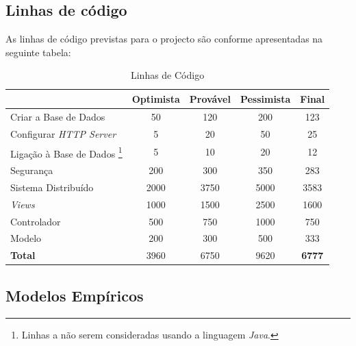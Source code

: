 \documentclass[12pt, a4paper, twoside]{report} %
\begin{document}
\subsection{Linhas de código}

As linhas de código previstas para o projecto são conforme apresentadas na seguinte tabela:

\begin{savenotes}
\begin{table}[h]
\centering
\begin{tabular}{|l|c c c c|}
\hline
										& Optimista & Provável & Pessimista & \textbf{Final} \\ \hline
Criar a Base de Dados  					& 50        & 120      & 200        & 123   		 \\ \hline
Configurar \textit{HTTP Server} 		& 5         & 20       & 50         & 25    		 \\ \hline
Ligação à Base de Dados \footnote{Linhas a não serem consideradas usando a linguagem \textit{Java}.}
										& 5         & 10       & 20         & 12    		 \\ \hline
Segurança              					& 200       & 300      & 350        & 283   		 \\ \hline
Sistema Distribuído\footnotemark	    & 2000      & 3750     & 5000       & 3583   		 \\ \hline
\textit{Views}            				& 1000      & 1500     & 2500       & 1600  		 \\ \hline
Controlador                 			& 500       & 750      & 1000       & 750   		 \\ \hline
Modelo                      			& 200       & 300      & 500        & 333   		 \\ \hline
\textbf{Total}		   					& 3960      & 6750     & 9620       & \textbf{6777}  \\ \hline
\end{tabular}
\caption{Linhas de Código}
\label{codigo}
\end{table}%
\end{savenotes}



\subsection{Modelos Empíricos}
\end{document}
